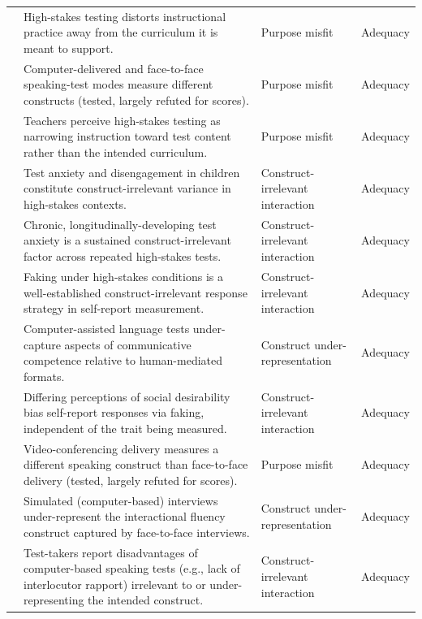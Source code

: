 \documentclass[11pt]{article}
\begin{document}
{\begin{longtable}{p{2.6cm} p{8.6cm} p{2.6cm} p{1.7cm}}
\citet{weick2024instruction} & High-stakes testing distorts instructional practice away from the curriculum it is meant to support. & Purpose misfit & Adequacy \\
\citet{dang2024vstep} & Computer-delivered and face-to-face speaking-test modes measure different constructs (tested, largely refuted for scores). & Purpose misfit & Adequacy \\
\citet{reese2004teachersperceptions} & Teachers perceive high-stakes testing as narrowing instruction toward test content rather than the intended curriculum. & Purpose misfit & Adequacy \\
\citet{wallace2010motivation} & Test anxiety and disengagement in children constitute construct-irrelevant variance in high-stakes contexts. & Construct-irrelevant interaction & Adequacy \\
\citet{tseng2024taiwanese} & Chronic, longitudinally-developing test anxiety is a sustained construct-irrelevant factor across repeated high-stakes tests. & Construct-irrelevant interaction & Adequacy \\
\citet{lee2025forcedchoice} & Faking under high-stakes conditions is a well-established construct-irrelevant response strategy in self-report measurement. & Construct-irrelevant interaction & Adequacy \\
\citet{nguyen2026examiners} & Computer-assisted language tests under-capture aspects of communicative competence relative to human-mediated formats. & Construct under-representation & Adequacy \\
\citet{kleinbub2026socialdesirability} & Differing perceptions of social desirability bias self-report responses via faking, independent of the trait being measured. & Construct-irrelevant interaction & Adequacy \\
\citet{nakatsuhara2021videoconferencing} & Video-conferencing delivery measures a different speaking construct than face-to-face delivery (tested, largely refuted for scores). & Purpose misfit & Adequacy \\
\citet{quaid2021fluency} & Simulated (computer-based) interviews under-represent the interactional fluency construct captured by face-to-face interviews. & Construct under-representation & Adequacy \\
\citet{amengual2017views} & Test-takers report disadvantages of computer-based speaking tests (e.g., lack of interlocutor rapport) irrelevant to or under-representing the intended construct. & Construct-irrelevant interaction & Adequacy \\
\end{longtable}
}
\end{document}
